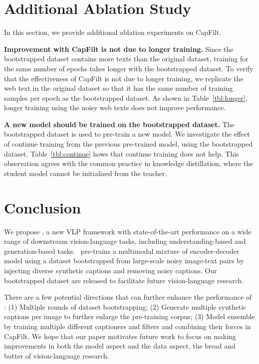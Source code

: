 



\vspace{-0.5ex}
\section{Additional Ablation Study}

In this section,
we provide additional ablation experiments on CapFilt.

\noindent\textbf{Improvement with CapFilt is not due to longer training.}
Since the bootstrapped dataset contains more texts than the original dataset,
training for the same number of epochs takes longer with the bootstrapped dataset.
To verify that the effectiveness of CapFilt is not due to longer training,
we replicate the web text in the original dataset so that it has the same number of training samples per epoch as the bootstrapped dataset.
As shown in Table~\ref{tbl:longer}, 
longer training using the noisy web texts does not improve performance.

\noindent\textbf{A new model should be trained on the bootstrapped dataset.}
The bootstrapped dataset is used to pre-train a new model.
We investigate the effect of continue training from the previous pre-trained model, using the bootstrapped dataset. 
Table~\ref{tbl:continue} hows that continue training does not help.
This observation agrees with the common practice in knowledge distillation,
where the student model cannot be initialized from the teacher.

\vspace{-1ex}
\section{Conclusion}
\vspace{-0.5ex}
We propose \name,
a new VLP framework with state-of-the-art performance on a wide range of downstream vision-language tasks,
including understanding-based and generation-based tasks.
\name~pre-trains a multimodal mixture of encoder-decoder model using a dataset bootstrapped from large-scale noisy image-text pairs by injecting diverse synthetic captions and removing noisy captions.
Our bootstrapped dataset are released to facilitate future vision-language research.

There are a few potential directions that can further enhance the performance of \name:
(1) Multiple rounds of dataset bootstrapping;
(2) Generate multiple synthetic captions per image to further enlarge the pre-training corpus;
(3) Model ensemble by training multiple different captioners and filters and combining their forces in CapFilt.
We hope that our paper motivates future work to focus on making improvements in both the model aspect and the data aspect,
the bread and butter of vision-language research.


